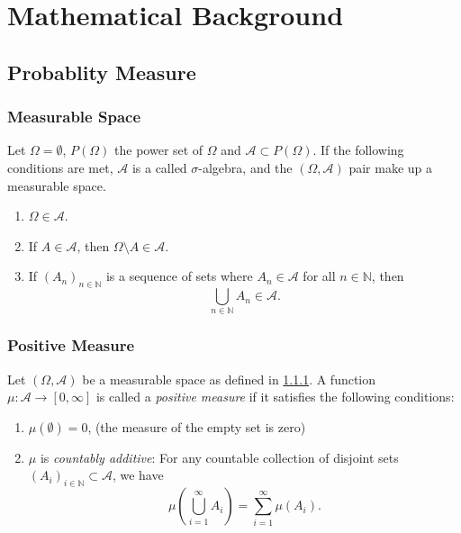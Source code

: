 \chapter{Mathematical Background}
\label{appendix:mathematical-notation}

\section{Probablity Measure}
\subsection{Measurable Space}
\label{section:measurable_space}
Let $\Omega = \emptyset$, $P(\Omega)$ the power set of $\Omega$ and $\mathcal{A} \subset P(\Omega)$. If the following conditions are met, $\mathcal{A}$ is a called $\sigma$-algebra, and the $(\Omega, \mathcal{A})$ pair make up a measurable space.


\begin{enumerate}
    \item $\Omega \in \mathcal{A}$.
    \item If $A \in \mathcal{A}$, then $\Omega \setminus A \in \mathcal{A}$.
    \item If $(A_n)_{n \in \mathbb{N}}$ is a sequence of sets where $A_n \in \mathcal{A}$ for all $n \in \mathbb{N}$, then 
    \begin{equation*}
        \bigcup_{n \in \mathbb{N}} A_n \in \mathcal{A}.
    \end{equation*}
\end{enumerate}

\subsection{Positive Measure}

Let $(\Omega, \mathcal{A})$ be a measurable space as defined in \ref{section:measurable_space}. A function $\mu: \mathcal{A} \to [0, \infty]$ is called a \textit{positive measure} if it satisfies the following conditions:

\begin{enumerate}
    \item $\mu(\emptyset) = 0$, (the measure of the empty set is zero)
    \item $\mu$ is \textit{countably additive}: For any countable collection of disjoint sets $(A_i)_{i \in \mathbb{N}} \subset \mathcal{A}$, we have
    \begin{equation*}
        \mu\left( \bigcup_{i=1}^{\infty} A_i \right) = \sum_{i=1}^{\infty} \mu(A_i).
    \end{equation*}
\end{enumerate}

